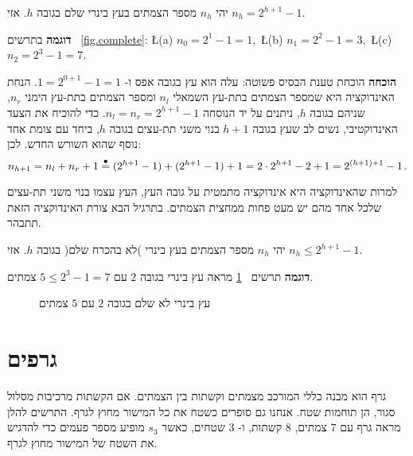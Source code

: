 \begin{theorem}
יהי 
$n_h$
מספר הצמתים בעץ בינרי שלם בגובה 
$h$.
אזי
$n_h = 2^{h+1}-1$.
\end{theorem}

\textbf{דוגמה} 
בתרשים~%
\ref{fig.complete}: \L{(a)} $n_0=2^1-1=1$,$\,$ \L{(b)} $n_1 = 2^2-1=3$,$\,$ \L{(c)} $n_2 = 2^3-1=7$.

\textbf{הוכחה} 
הוכחת טענת הבסיס פשוטה: עלה הוא עץ בגובה אפס ו-%
$1 = 2^{0+1}-1=1$.
הנחת האינדוקציה היא שמספר הצמתים בתת-עץ השמאלי
$n_l$
ומספר הצמתים בתת-עץ הימני
$n_r$,
שניהם בגובה
$h$,
ניתנים על יד הנוסחה
$n_l=n_r=2^{h+1}-1$.
כדי להוכיח את הצעד האינדוקטיבי, נשים לב שעץ בגובה 
$h+1$
בנוי משני תת-עצים בגובה
$h$,
ביחד עם צומת אחד נוסף שהוא השורש החדש. לכן:
\[
n_{h+1} = n_l + n_r + 1 \stackrel{\bullet}{=}{} (2^{h+1}-1) + (2^{h+1}-1) + 1 = 2\cdot 2^{h+1} -2 +1= 2^{(h+1)+1} - 1\,.
\]


למרות שהאינדוקציה היא אינדוקציה מתמטית על גובה העץ, העץ עצמו בנוי משני תת-עצים שלכל אחד מהם יש מעט פחות ממחצית הצמתים. בתרגיל הבא צורת האינדוקציה הזאת תתבהר.
\begin{exercise}
יהי
$n_h$
מספר הצמתים בעץ בינרי )לא בהכרח שלם( בגובה
$h$.
אזי
$n_h\leq 2^{h+1}-1$.
\end{exercise}

\textbf{דוגמה} 
תרשים~%
\ref{fig.incomplete}
מראה עץ בינרי בגובה
$2$
עם
$5 \leq 2^3-1=7$
צמתים.

\begin{figure}[t]
\begin{center}
\caption{%
עץ בינרי לא שלם בגובה
$2$
עם
$5$
צמתים
}\label{fig.incomplete}
\end{center}
\end{figure}

\section{%
גרפים%
}

גרף הוא מבנה כללי המורכב מצמתים וקשתות בין הצמתים. אם הקשתות מרכיבות מסלול סגור, הן תוחמות שטח. אנחנו גם סופרים כשטח את כל המישור מחוץ לגרף. התרשים להלן מראה גרף עם
$7$
צמתים,
$8$
קשתות, ו-%
$3$
שטחים, כאשר 
$s_3$
מופיע מספר פעמים כדי להדגיש את השטח של המישור מחוץ לגרף.

